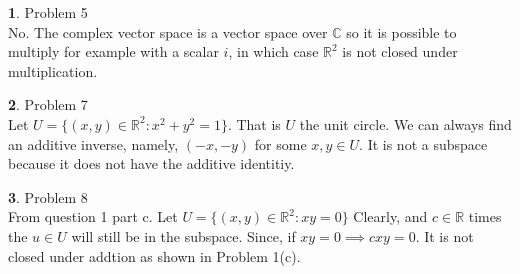 \documentclass[10pt, twocolumn]{article}
\newcommand{\C}{\mathbb{C}}
\newcommand{\R}{\mathbb{R}}
\theoremstyle{definition}
\newtheorem{q}{}
\begin{document}
\begin{q}
    Problem 5 \\
    No. The complex vector space is a vector space over $ \C $ so it is possible to multiply for example with a scalar $ i $, 
    in which case $ \R^2 $ is not closed under multiplication.
\end{q}
\begin{q}
    Problem 7 \\
    Let $ U = \{(x, y) \in \R^2 : x^2 + y^2 = 1\} $. That is $ U $ the unit circle. 
    We can always find an additive inverse, namely, $(-x, -y)$ for some $ x, y \in U $. 
    It is not a subspace because it does not have the additive identitiy.
\end{q}
\begin{q}
    Problem 8 \\
    From question 1 part c. 
    Let $U =\{(x, y) \in \R^2 : xy = 0\} $
    Clearly, and $ c \in \R $ times the $ u \in U $ will still be in the subspace. Since, if $ xy = 0 \implies cxy = 0 $. 
    It is not closed under addtion as shown in Problem 1(c).
\end{q}
\end{document}
